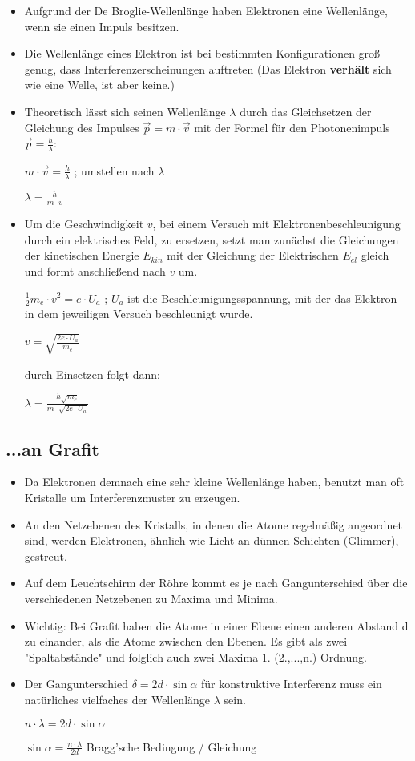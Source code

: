 \begin{itemize}
\item Aufgrund der De Broglie-Wellenlänge haben Elektronen eine Wellenlänge, wenn sie einen Impuls besitzen.
\item Die Wellenlänge eines Elektron ist bei bestimmten Konfigurationen groß genug, dass Interferenzerscheinungen auftreten (Das Elektron \textbf{verhält} sich wie eine Welle, ist aber keine.)
\item Theoretisch lässt sich seinen Wellenlänge $\lambda$ durch das Gleichsetzen der Gleichung des Impulses $\vec{p}=m\cdot\vec{v}$ mit der Formel für den Photonenimpuls $\vec{p}=\frac{h}{\lambda}$:

$m\cdot\vec{v}=\frac{h}{\lambda}$  ; umstellen nach $\lambda$

$\lambda = \frac{h}{m \cdot v} $

\item Um die Geschwindigkeit $v$, bei einem Versuch mit Elektronenbeschleunigung durch ein elektrisches Feld, zu ersetzen, setzt man zunächst die Gleichungen der kinetischen Energie $E_{kin}$ mit der Gleichung der Elektrischen $E_{el}$ gleich und formt anschließend nach $v$ um.

$\frac{1}{2} m_e \cdot v^2 = e \cdot U_a$  ; $U_a$ ist die Beschleunigungsspannung, mit der das Elektron in dem jeweiligen Versuch beschleunigt wurde.

$v = \sqrt{\frac{2e \cdot U_a}{m_e}}$

durch Einsetzen folgt dann:

\Large $\lambda = \frac{h \sqrt{m_e}}{m \cdot \sqrt{2e \cdot U_a}} $
\end{itemize}

\subsection{...an Grafit}
\begin{itemize}
\item Da Elektronen demnach eine sehr kleine Wellenlänge haben, benutzt man oft Kristalle um Interferenzmuster zu erzeugen.
\item An den Netzebenen des Kristalls, in denen die Atome regelmäßig angeordnet sind, werden Elektronen, ähnlich wie Licht an dünnen Schichten (Glimmer), gestreut.
\item Auf dem Leuchtschirm der Röhre kommt es je nach Gangunterschied über die verschiedenen Netzebenen zu Maxima und Minima.
\item Wichtig: Bei Grafit haben die Atome in einer Ebene einen anderen Abstand d zu einander, als die Atome zwischen den Ebenen. Es gibt als zwei "Spaltabstände" und folglich auch zwei Maxima 1. (2.,...,n.) Ordnung.

\item Der Gangunterschied $\delta = 2d\cdot\sin{\alpha} $ für konstruktive Interferenz muss ein natürliches vielfaches der Wellenlänge $\lambda$ sein.

$n \cdot \lambda = 2d \cdot \sin{\alpha}$

\Large $\sin{\alpha} = \frac{n \cdot \lambda}{2d}$ Bragg'sche Bedingung / Gleichung
\end{itemize}

